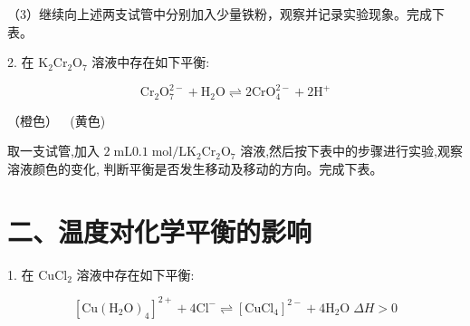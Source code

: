 \documentclass[10pt]{article}
\begin{document}
（3）继续向上述两支试管中分别加入少量铁粉，观察并记录实验现象。完成下表。

\begin{center}
\end{center}

2. 在 \({\mathrm{K}}_{2}{\mathrm{{Cr}}}_{2}{\mathrm{O}}_{7}\) 溶液中存在如下平衡:

\[
{\mathrm{{Cr}}}_{2}{\mathrm{O}}_{7}^{2 - } + {\mathrm{H}}_{2}\mathrm{O} \rightleftharpoons 2{\mathrm{{CrO}}}_{4}^{2 - } + 2{\mathrm{H}}^{ + }
\]

（橙色） \(\;\) (黄色)

取一支试管,加入 \(2\mathrm{\;{mL}}{0.1}\mathrm{\;{mol}}/\mathrm{L}{\mathrm{K}}_{2}{\mathrm{{Cr}}}_{2}{\mathrm{O}}_{7}\) 溶液,然后按下表中的步骤进行实验,观察溶液颜色的变化, 判断平衡是否发生移动及移动的方向。完成下表。

\begin{center}
\end{center}

\section*{二、温度对化学平衡的影响}

1. 在 \({\mathrm{{CuCl}}}_{2}\) 溶液中存在如下平衡:

\[
{\left\lbrack \mathrm{{Cu}}{\left( {\mathrm{H}}_{2}\mathrm{O}\right) }_{4}\right\rbrack }^{2 + } + 4{\mathrm{{Cl}}}^{ - } \rightleftharpoons {\left\lbrack {\mathrm{{CuCl}}}_{4}\right\rbrack }^{2 - } + 4{\mathrm{H}}_{2}\mathrm{O}\;{\Delta H} > 0
\]
\end{document}

